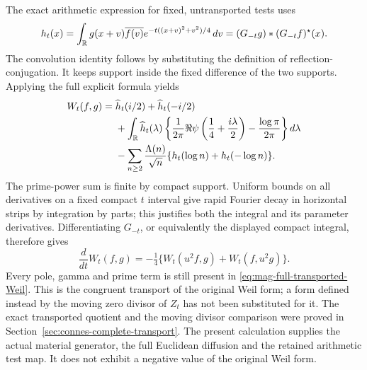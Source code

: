The exact arithmetic expression for fixed, untransported tests uses
\[
 h_t(x)=\int_\mathbb R g(x+v)\overline{f(v)}
              e^{-t((x+v)^2+v^2)/4}\,dv
       =(G_{-t}g)*(G_{-t}f)^\star(x).
\]
The convolution identity follows by substituting the definition of
reflection-conjugation. It keeps support inside the fixed difference
of the two supports. Applying the full explicit formula
\cite{weil1952,alpogeFurman2026} yields
\begin{align}
 W_t(f,g)={}&\widehat h_t(i/2)+\widehat h_t(-i/2)\notag\\
 &+\int_\mathbb R\widehat h_t(\lambda)
   \left\{\frac1{2\pi}\Re\psi\left(\frac14+\frac{i\lambda}{2}\right)
                       -\frac{\log\pi}{2\pi}\right\}d\lambda\notag\\
 &-\sum_{n\ge2}\frac{\Lambda(n)}{\sqrt n}
             \{h_t(\log n)+h_t(-\log n)\}.
 \label{eq:mag-full-transported-Weil}
\end{align}
The prime-power sum is finite by compact support. Uniform bounds on
all derivatives on a fixed compact $t$ interval give rapid Fourier
decay in horizontal strips by integration by parts; this justifies
both the integral and its parameter derivatives. Differentiating
$G_{-t}$, or equivalently the displayed compact integral, therefore gives
\[
 \frac d{dt}W_t(f,g)
 =-\tfrac14\{W_t(u^2f,g)+W_t(f,u^2g)\}.
\]
Every pole, gamma and prime term is still present in
\eqref{eq:mag-full-transported-Weil}. This is the congruent transport
of the original Weil form; a form defined instead by the moving
zero divisor of $Z_t$ has not been substituted for it. The exact
transported quotient and the moving divisor comparison were proved
in Section~\ref{sec:connes-complete-transport}. The present
calculation supplies the actual material generator, the full
Euclidean diffusion and the retained arithmetic test map. It
does not exhibit a negative value of the original Weil form.

